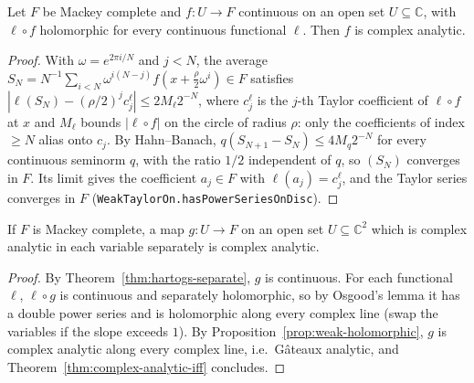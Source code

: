 \begin{proposition}
  \label{prop:weak-holomorphic}
  \leanok
  Let $F$ be Mackey complete and $f \colon U \to F$ continuous on an open set
  $U \subseteq \mathbb{C}$, with $\ell \circ f$ holomorphic for every continuous functional $\ell$.
  Then $f$ is complex analytic.
\end{proposition}

\begin{proof}
  \leanok
  With $\omega = e^{2\pi i/N}$ and $j < N$, the average
  $S_N = N^{-1} \sum_{i<N} \omega^{i(N-j)} f(x + \tfrac{\rho}{2}\omega^i) \in F$ satisfies
  $|\ell(S_N) - (\rho/2)^j c_j^\ell| \le 2 M_\ell 2^{-N}$, where $c_j^\ell$ is the $j$-th Taylor
  coefficient of $\ell \circ f$ at $x$ and $M_\ell$ bounds $|\ell \circ f|$ on the circle of radius
  $\rho$: only the coefficients of index $\ge N$ alias onto $c_j$. By Hahn--Banach,
  $q(S_{N+1} - S_N) \le 4 M_q 2^{-N}$ for every continuous seminorm $q$, with the ratio $1/2$
  independent of $q$, so $(S_N)$ converges in $F$. Its limit gives the coefficient $a_j \in F$
  with $\ell(a_j) = c_j^\ell$, and the Taylor series converges in $F$
  (\texttt{WeakTaylorOn.hasPowerSeriesOnDisc}).
\end{proof}

\begin{theorem}
  \label{thm:hartogs-joint}
  \leanok
  If $F$ is Mackey complete, a map $g \colon U \to F$ on an open set $U \subseteq \mathbb{C}^2$
  which is complex analytic in each variable separately is complex analytic.
\end{theorem}

\begin{proof}
  \leanok
  By Theorem~\ref{thm:hartogs-separate}, $g$ is continuous. For each functional $\ell$,
  $\ell \circ g$ is continuous and separately holomorphic, so by Osgood's lemma it has a double
  power series and is holomorphic along every complex line (swap the variables if the slope
  exceeds $1$). By Proposition~\ref{prop:weak-holomorphic}, $g$ is complex analytic along every
  complex line, i.e.\ Gâteaux analytic, and Theorem~\ref{thm:complex-analytic-iff} concludes.
\end{proof}

